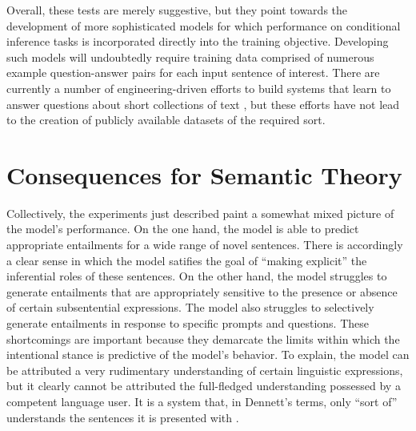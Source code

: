 Overall, these tests are merely suggestive, but they point towards the development of more sophisticated models for which performance on conditional inference tasks is incorporated directly into the training objective. Developing such models will undoubtedly require training data comprised of numerous example question-answer pairs for each input sentence of interest. There are currently a number of engineering-driven efforts to build systems that learn to answer questions about short collections of text \citep[e.g.][]{Weston:2015,Weston:2016,Sukhbataar:2015}, but these efforts have not lead to the creation of publicly available datasets of the required sort.

\section{Consequences for Semantic Theory}\label{sec:consequences}

Collectively, the experiments just described paint a somewhat mixed picture of the model's performance. On the one hand, the model is able to predict appropriate entailments for a wide range of novel sentences. There is accordingly a clear sense in which the model satifies the goal of ``making explicit'' the inferential roles of these sentences. On the other hand, the model struggles to generate entailments that are appropriately sensitive to the presence or absence of certain subsentential expressions. The model also struggles to selectively generate entailments in response to specific prompts and questions. These shortcomings are important because they demarcate the limits within which the intentional stance is predictive of the model's behavior. To explain, the model can be attributed a very rudimentary understanding of certain linguistic expressions, but it clearly cannot be attributed the full-fledged understanding possessed by a competent language user. It is a system that, in Dennett's terms, only ``sort of'' understands the sentences it is presented with \citep[qtd. in][]{Rothman:2017}.

